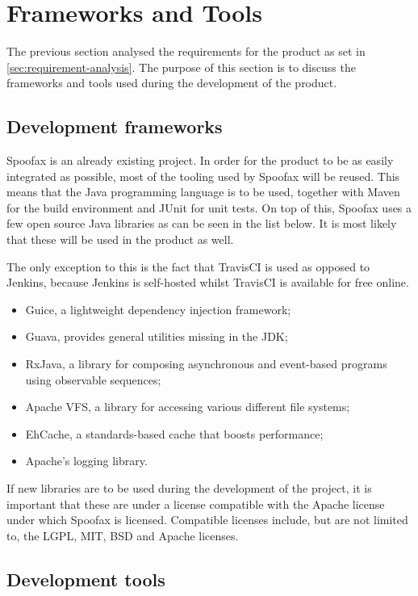 \section{Frameworks and Tools}
\label{sec:realisation-product}

The previous section analysed the requirements for the product as set in
\cref{sec:requirement-analysis}. The purpose of this section is to discuss the
frameworks and tools used during the development of the product.

\subsection{Development frameworks}
\label{ssec:frameworks}

Spoofax is an already existing project. In order for the product to be as easily
integrated as possible, most of the tooling used by Spoofax will be reused. This
means that the Java programming language is to be used, together with Maven for
the build environment and JUnit for unit tests. On top of this, Spoofax uses a
few open source Java libraries as can be seen in the list below. It is most
likely that these will be used in the product as well.

The only exception to this is the fact that TravisCI is used as opposed to
Jenkins, because Jenkins is self-hosted whilst TravisCI is available for free
online.

\begin{itemize}
  \item Guice, a lightweight dependency injection framework;
  \item Guava, provides general utilities missing in the JDK;
  \item RxJava, a library for composing asynchronous and event-based programs
    using observable sequences;
  \item Apache VFS, a library for accessing various different file systems;
  \item EhCache, a standards-based cache that boosts performance;
  \item Apache's logging library.
\end{itemize}

If new libraries are to be used during the development of the project, it is
important that these are under a license compatible with the Apache license
under which Spoofax is licensed. Compatible licenses include, but are not
limited to, the LGPL, MIT, BSD and Apache licenses.

\subsection{Development tools}
\label{ssec:tools}

